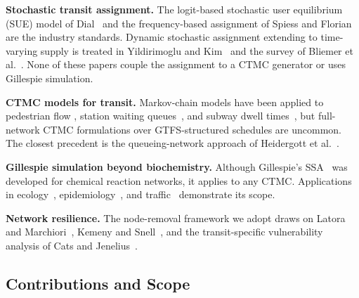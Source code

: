 \documentclass[12pt,a4paper]{article}
\theoremstyle{plain}
\theoremstyle{definition}
\theoremstyle{remark}
\begin{document}
\textbf{Stochastic transit assignment.}
The logit-based stochastic user equilibrium (SUE) model of Dial~\citep{dial1971}
and the frequency-based assignment of Spiess and Florian~\citep{spiess1989} are
the industry standards.  Dynamic stochastic assignment extending to
time-varying supply is treated in Yildirimoglu and Kim~\citep{yildirimoglu2018}
and the survey of Bliemer et al.~\citep{bliemer2003}.  None of these papers
couple the assignment to a CTMC generator or uses Gillespie simulation.

\textbf{CTMC models for transit.}
Markov-chain models have been applied to pedestrian flow
\citep{helbing2000},
station waiting queues~\citep{jaiswal1961}, and subway dwell
times~\citep{zhang2019}, but full-network CTMC formulations over
GTFS-structured schedules are uncommon.  The closest precedent is the
queueing-network approach of Heidergott et al.~\citep{heidergott2010}.

\textbf{Gillespie simulation beyond biochemistry.}
Although Gillespie's SSA~\citep{gillespie1977} was developed for chemical
reaction networks, it applies to any CTMC.  Applications in
ecology~\citep{wilkinson2018}, epidemiology~\citep{allen2008}, and
traffic~\citep{maerivoet2005} demonstrate its scope.

\textbf{Network resilience.}
The node-removal framework we adopt draws on Latora and
Marchiori~\citep{latora2001}, Kemeny and Snell~\citep{kemeny1976}, and the
transit-specific vulnerability analysis of Cats and
Jenelius~\citep{cats2014}.

\subsection{Contributions and Scope}
\end{document}
